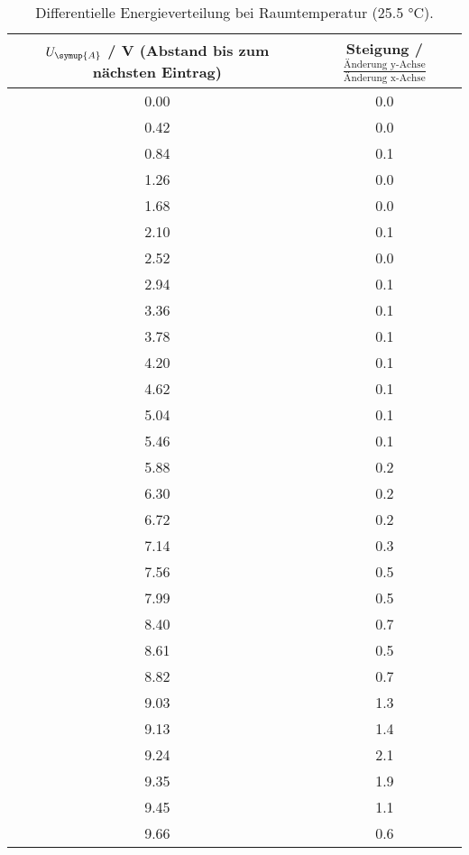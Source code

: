 \begin{table}[!htp]
\centering
\caption{Differentielle Energieverteilung bei Raumtemperatur (25.5 °C).}
\label{tab:messreihe1}
\begin{tabular} {c c}
\toprule
 {{$U_{\symup{A}}$ / V (Abstand bis zum nächsten Eintrag)}} & {{Steigung  / $\frac{\text{Änderung y-Achse}}{\text{Änderung x-Achse}}$}}  \\
\midrule
0.00 & 0.0   \\
0.42 & 0.0   \\
0.84 & 0.1 \\
1.26 & 0.0   \\
1.68 & 0.0   \\
2.10 & 0.1 \\
2.52 & 0.0   \\
2.94 & 0.1 \\
3.36 & 0.1 \\
3.78 & 0.1 \\
4.20 & 0.1 \\
4.62 & 0.1 \\
5.04 & 0.1 \\
5.46 & 0.1 \\
5.88 & 0.2 \\
6.30 & 0.2 \\
6.72 & 0.2 \\
7.14 & 0.3 \\
7.56 & 0.5 \\
7.99 & 0.5 \\
8.40 & 0.7 \\
8.61 & 0.5 \\
8.82 & 0.7 \\
9.03 & 1.3 \\
9.13 & 1.4 \\
9.24 & 2.1 \\
9.35 & 1.9 \\
9.45 & 1.1 \\
9.66 & 0.6 \\
\bottomrule 
\end{tabular}
\end{table}